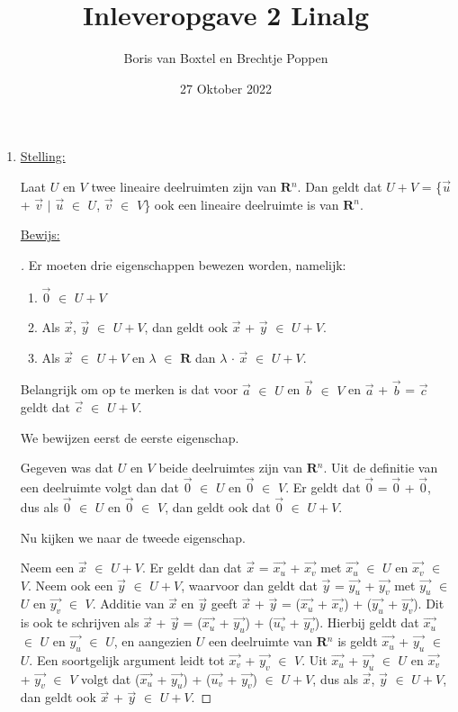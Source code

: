 \documentclass[12pt, a4paper]{article}
\title{Inleveropgave 2 Linalg}
\author{Boris van Boxtel en Brechtje Poppen}
\date{27 Oktober 2022}
\begin{document}
\maketitle 

\begin{enumerate}[(a.)]
\item  \underline{Stelling:} 

Laat $U$ en $V$ twee lineaire deelruimten zijn van $\mathbf{R}$$^n$. Dan geldt dat $U + V$ = \{$\vec u$ + $\vec v$ $\vert$ $\vec u$ $\in$ $U$, $\vec v$ $\in$ $V$\} ook een lineaire deelruimte is van $\mathbf{R}$$^n$.

\underline{Bewijs:}\begin{proof}[\unskip\nopunct]
Er moeten drie eigenschappen bewezen worden, namelijk:
\begin{enumerate}[1.]
\item $\vec{0}$ $\in$ $U + V$
\item Als $\vec{x}$, $\vec{y}$ $\in$ $U + V$, dan geldt ook $\vec{x}$ + $\vec{y}$ $\in$ $U + V$.
\item Als $\vec{x}$ $\in$ $U + V$ en $\lambda$ $\in$ $\mathbf{R}$ dan $\lambda$ $\cdot$ $\vec{x}$ $\in$ $U + V$. 
\end{enumerate}
Belangrijk om op te merken is dat voor $\vec{a}$ $\in$ $U$ en $\vec{b}$ $\in$ $V$ en $\vec{a}$ + $\vec{b}$ = $\vec{c}$ geldt dat $\vec{c}$ $\in$ $U + V$. 

We bewijzen eerst de eerste eigenschap. 

Gegeven was dat $U$ en $V$ beide deelruimtes zijn van $\mathbf{R}$$^n$. Uit de definitie van een deelruimte volgt dan dat $\vec{0}$ $\in$ $U$ en $\vec{0}$ $\in$ $V$. Er geldt dat $\vec{0}$ = $\vec{0}$ + $\vec{0}$, dus als $\vec{0}$ $\in$ $U$ en $\vec{0}$ $\in$ $V$, dan geldt ook dat $\vec{0}$ $\in$ $U + V$. 

Nu kijken we naar de tweede eigenschap.

Neem een $\vec{x}$ $\in$ $U + V$. Er geldt dan dat $\vec{x}$ = $\vec{x_{u}}$ + $\vec{x_{v}}$ met $\vec{x_{u}}$ $\in$ $U$ en $\vec{x_{v}}$ $\in$ $V$. Neem ook een $\vec{y}$ $\in$ $U + V$, waarvoor dan geldt dat $\vec{y}$ = $\vec{y_{u}}$ + $\vec{y_{v}}$ met $\vec{y_{u}}$ $\in$ $U$ en $\vec{y_{v}}$ $\in$ $V$. Additie van $\vec{x}$ en $\vec{y}$ geeft $\vec{x}$ + $\vec{y}$ = ($\vec{x_{u}}$ + $\vec{x_{v}}$) + ($\vec{y_{u}}$ + $\vec{y_{v}}$). Dit is ook te schrijven als $\vec{x}$ + $\vec{y}$ = ($\vec{x_{u}}$ + $\vec{y_{u}}$) + ($\vec{u_{v}}$ + $\vec{y_{v}}$). Hierbij geldt dat $\vec{x_{u}}$ $\in$ $U$ en $\vec{y_{u}}$ $\in$ $U$, en aangezien $U$ een deelruimte van $\mathbf{R}$$^n$ is geldt $\vec{x_{u}}$ + $\vec{y_{u}}$ $\in$ $U$. Een soortgelijk argument leidt tot $\vec{x_{v}}$ + $\vec{y_{v}}$ $\in$ $V$. Uit $\vec{x_{u}}$ + $\vec{y_{u}}$ $\in$ $U$ en $\vec{x_{v}}$ + $\vec{y_{v}}$ $\in$ $V$ volgt dat ($\vec{x_{u}}$ + $\vec{y_{u}}$) + ($\vec{u_{v}}$ + $\vec{y_{v}}$) $\in$ $U + V$, dus als $\vec{x}$, $\vec{y}$ $\in$ $U + V$, dan geldt ook $\vec{x}$ + $\vec{y}$ $\in$ $U + V$.


\end{proof}
\end{enumerate}
\end{document}
